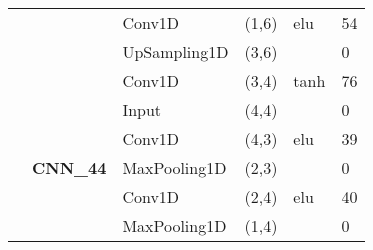 \begin{table}[H]
\begin{center}
\begin{tabular}{ll|l|l|l|l|}
\multicolumn{1}{|l|}{}                                                                  &                                   & Conv1D                             & (1,6)                                & elu                                     & 54                                          \\ \cline{3-6} 
\multicolumn{1}{|l|}{}                                                                  &                                   & UpSampling1D                       & (3,6)                                &                                          & 0                                           \\ \cline{3-6} 
\multicolumn{1}{|l|}{}                                                                  &                                   & Conv1D                             & (3,4)                                & tanh                                     & 76                                          \\ \cline{2-6} 
\multicolumn{1}{|l|}{}                                                                  & \multirow{8}{*}{\textbf{CNN\_44}} & Input                              & (4,4)                                &                                          & 0                                           \\ \cline{3-6} 
\multicolumn{1}{|l|}{}                                                                  &                                   & Conv1D                             & (4,3)                                & elu                                     & 39                                          \\ \cline{3-6} 
\multicolumn{1}{|l|}{}                                                                  &                                   & MaxPooling1D                       & (2,3)                                &                                          & 0                                           \\ \cline{3-6} 
\multicolumn{1}{|l|}{}                                                                  &                                   & Conv1D                             & (2,4)                                & elu                                     & 40                                          \\ \cline{3-6} 
\multicolumn{1}{|l|}{}                                                                  &                                   & MaxPooling1D                       & (1,4)                                &                                          & 0                                           \\ \cline{3-6} 

\end{tabular}
\end{center}
\end{table}
